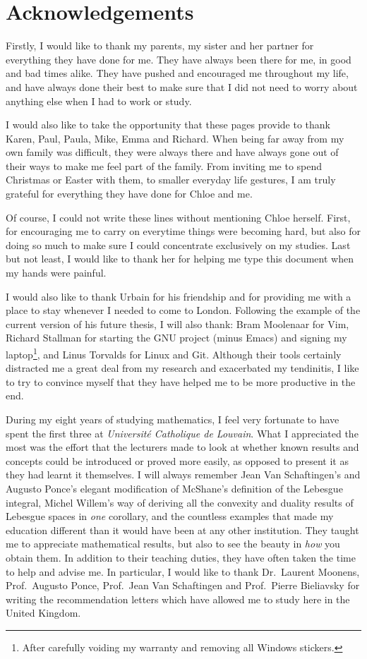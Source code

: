 \chapter*{Acknowledgements}

Firstly, I would like to thank my parents, my sister and her partner for everything they have done for me.
They have always been there for me,
in good and bad times alike.
They have pushed and encouraged me throughout my life,
and have always done their best to make sure that I did not need to worry about anything else when I had to work or study.

I would also like to take the opportunity that these pages provide to thank Karen, Paul, Paula, Mike, Emma and Richard.
When being far away from my own family was difficult,
they were always there and have always gone out of their ways to make me feel part of the family.
From inviting me to spend Christmas or Easter with them,
to smaller everyday life gestures,
I am truly grateful for everything they have done for Chloe and me.

Of course,
I could not write these lines without mentioning Chloe herself.
First, for encouraging me to carry on everytime things were becoming hard,
but also for doing so much to make sure I could concentrate exclusively on my studies.
Last but not least,
I would like to thank her for helping me type this document
when my hands were painful.

I would also like to thank Urbain for his friendship and for providing me with a place to stay whenever I needed to come to London.
Following the example of the current version of his future thesis,
I will also thank:
Bram Moolenaar for Vim,
Richard Stallman for starting the GNU project (minus Emacs) and signing my laptop\footnote{After carefully voiding my warranty and removing all Windows stickers.},
and Linus Torvalds for Linux and Git.
Although their tools certainly distracted me a great deal from my research
and exacerbated my tendinitis,
I like to try to convince myself that they have helped me to be more productive in the end.

During my eight years of studying mathematics,
I feel very fortunate to have spent the first three at \emph{Universit\'e Catholique de Louvain}.
What I appreciated the most was the effort that the lecturers made to look at
whether known results and concepts could be introduced or proved more easily,
as opposed to present it as they had learnt it themselves.
I will always remember Jean Van Schaftingen's and Augusto Ponce's elegant modification of McShane's definition of the Lebesgue integral,
Michel Willem's way of deriving all the convexity and duality results of Lebesgue spaces in \emph{one} corollary,
and the countless examples that made my education different than it would have been at any other institution.
They taught me to appreciate mathematical results,
but also to see the beauty in \emph{how} you obtain them.
In addition to their teaching duties,
they have often taken the time to help and advise me.
In particular,
I would like to thank Dr.\ Laurent Moonens,
Prof.\ Augusto Ponce, Prof.\ Jean Van Schaftingen and Prof.\ Pierre Bieliavsky for writing the recommendation letters which have allowed me to study here in the United Kingdom.

